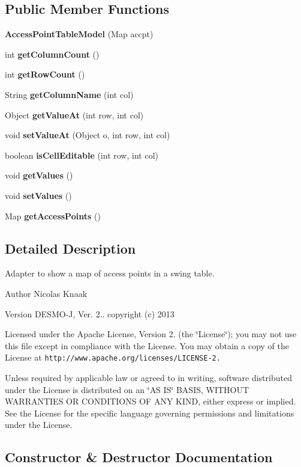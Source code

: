 \subsection*{Public Member Functions}
\begin{DoxyCompactItemize}
\item 
{\bf Access\-Point\-Table\-Model} (Map accpt)
\item 
int {\bf get\-Column\-Count} ()
\item 
int {\bf get\-Row\-Count} ()
\item 
String {\bf get\-Column\-Name} (int col)
\item 
Object {\bf get\-Value\-At} (int row, int col)
\item 
void {\bf set\-Value\-At} (Object o, int row, int col)
\item 
boolean {\bf is\-Cell\-Editable} (int row, int col)
\item 
void {\bf get\-Values} ()
\item 
void {\bf set\-Values} ()
\item 
Map {\bf get\-Access\-Points} ()
\end{DoxyCompactItemize}


\subsection{Detailed Description}
Adapter to show a map of access points in a swing table.

\begin{DoxyAuthor}{Author}
Nicolas Knaak 
\end{DoxyAuthor}
\begin{DoxyVersion}{Version}
D\-E\-S\-M\-O-\/\-J, Ver. 2.. copyright (c) 2013
\end{DoxyVersion}
Licensed under the Apache License, Version 2. (the \char`\"{}\-License\char`\"{}); you may not use this file except in compliance with the License. You may obtain a copy of the License at {\tt http\-://www.\-apache.\-org/licenses/\-L\-I\-C\-E\-N\-S\-E-\/2.}

Unless required by applicable law or agreed to in writing, software distributed under the License is distributed on an \char`\"{}\-A\-S I\-S\char`\"{} B\-A\-S\-I\-S, W\-I\-T\-H\-O\-U\-T W\-A\-R\-R\-A\-N\-T\-I\-E\-S O\-R C\-O\-N\-D\-I\-T\-I\-O\-N\-S O\-F A\-N\-Y K\-I\-N\-D, either express or implied. See the License for the specific language governing permissions and limitations under the License. 

\subsection{Constructor \& Destructor Documentation}

